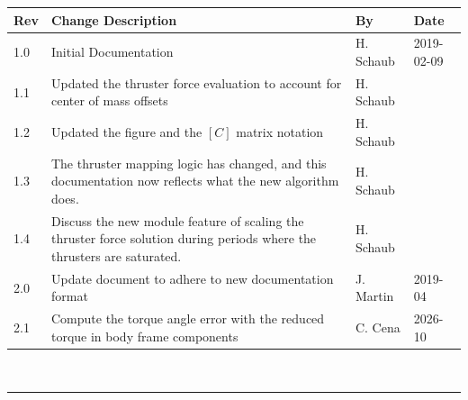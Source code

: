 \documentclass[]{BasiliskReportMemo}
\begin{document}
\makeCover
%
%
\pagestyle{empty}
{\renewcommand{\arraystretch}{2}
\noindent
\begin{longtable}{|p{0.5in}|p{3.5in}|p{1.07in}|p{0.9in}|}
\hline
{\bfseries Rev} & {\bfseries Change Description} & {\bfseries By}& {\bfseries Date} \\
\hline
1.0 & Initial Documentation & H. Schaub & 2019-02-09\\
\hline
1.1 & Updated the thruster force evaluation to account for center of mass offsets & H. Schaub & \\
\hline
1.2 & Updated the figure and the $[C]$ matrix notation & H. Schaub & \\
\hline
1.3 & The thruster mapping logic has changed, and this documentation now reflects what the new algorithm does. & H. Schaub & \\
\hline
1.4 & Discuss the new module feature of scaling the thruster force solution during periods where the thrusters are saturated. & H. Schaub & \\
\hline
2.0 & Update document to adhere to new documentation format & J. Martin & 2019-04 \\
\hline
2.1 & Compute the torque angle error with the reduced torque in body frame components & C. Cena & 2026-10 \\
\hline

\end{longtable}
}



\newpage
\setcounter{page}{1}
\pagestyle{fancy}

\tableofcontents %
~\\ \hrule ~\\ %










\end{document}
